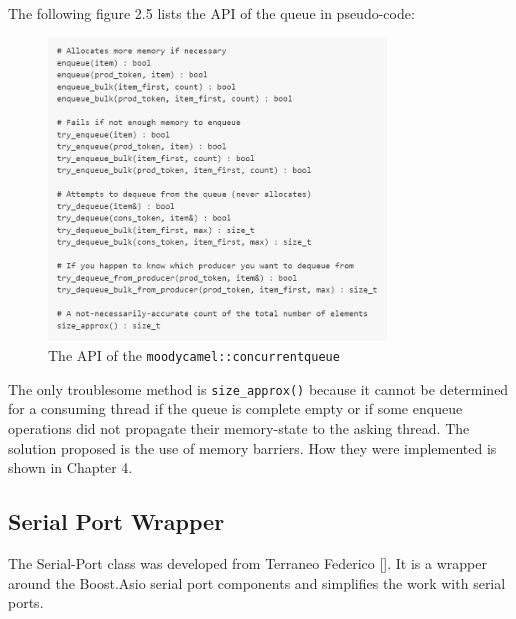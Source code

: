 The following figure 2.5 lists the API of the queue in pseudo-code:

\begin{figure}[h]
\centering
      \includegraphics[width=0.8\textwidth]{moody}
        \caption{The API of the \texttt{moodycamel::concurrentqueue}}
\end{figure}

The only troublesome method is \texttt{size\_approx()} because it cannot be determined for a consuming thread if the queue is complete empty or if some enqueue operations did not propagate their memory-state to the asking thread. The solution proposed is the use of memory barriers. How they were implemented is shown in Chapter 4.
\subsection{Serial Port Wrapper}
The Serial-Port class was developed from Terraneo Federico []. It is a wrapper around the Boost.Asio serial port components and simplifies the work with serial ports. 
